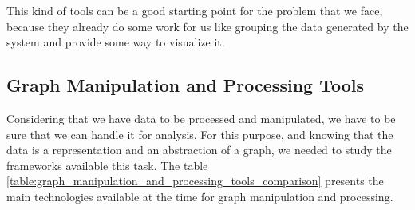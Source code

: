This kind of tools can be a good starting point for the problem that we face, because they already do some work for us like grouping the data generated by the system and provide some way to visualize it. 

\subsection{Graph Manipulation and Processing Tools}
\label{subsec:graph_manipulation_and_processing_tools}

Considering that we have data to be processed and manipulated, we have to be sure that we can handle it for analysis. For this purpose, and knowing that the data is a representation and an abstraction of a graph, we needed to study the frameworks available this task. The table \ref{table:graph_manipulation_and_processing_tools_comparison} presents the main technologies available at the time for graph manipulation and processing.

